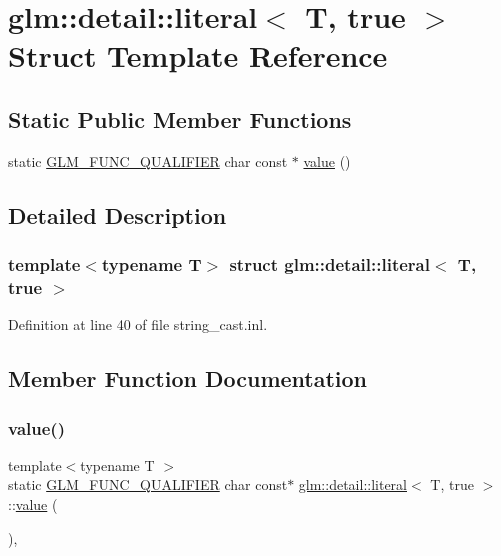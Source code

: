 \hypertarget{structglm_1_1detail_1_1literal_3_01_t_00_01true_01_4}{}\section{glm\+::detail\+::literal$<$ T, true $>$ Struct Template Reference}
\label{structglm_1_1detail_1_1literal_3_01_t_00_01true_01_4}
\subsection*{Static Public Member Functions}
\begin{DoxyCompactItemize}
\item 
static \mbox{\hyperlink{setup_8hpp_a33fdea6f91c5f834105f7415e2a64407}{G\+L\+M\+\_\+\+F\+U\+N\+C\+\_\+\+Q\+U\+A\+L\+I\+F\+I\+ER}} char const  $\ast$ \mbox{\hyperlink{structglm_1_1detail_1_1literal_3_01_t_00_01true_01_4_ae18b91cfeeb373f6b7c62572f88cf239}{value}} ()
\end{DoxyCompactItemize}


\subsection{Detailed Description}
\subsubsection*{template$<$typename T$>$\newline
struct glm\+::detail\+::literal$<$ T, true $>$}



Definition at line 40 of file string\+\_\+cast.\+inl.



\subsection{Member Function Documentation}
\mbox{\label{structglm_1_1detail_1_1literal_3_01_t_00_01true_01_4_ae18b91cfeeb373f6b7c62572f88cf239}} 
\subsubsection{\texorpdfstring{value()}{value()}}
{\footnotesize\ttfamily template$<$typename T $>$ \\
static \mbox{\hyperlink{setup_8hpp_a33fdea6f91c5f834105f7415e2a64407}{G\+L\+M\+\_\+\+F\+U\+N\+C\+\_\+\+Q\+U\+A\+L\+I\+F\+I\+ER}} char const$\ast$ \mbox{\hyperlink{structglm_1_1detail_1_1literal}{glm\+::detail\+::literal}}$<$ T, true $>$\+::\mbox{\hyperlink{glad_8h_a03aff08f73d7fde3d1a08e0abd8e84fa}{value}} (\begin{DoxyParamCaption}{ }\end{DoxyParamCaption})\hspace{0.3cm}{\ttfamily [inline]}, {\ttfamily [static]}}



